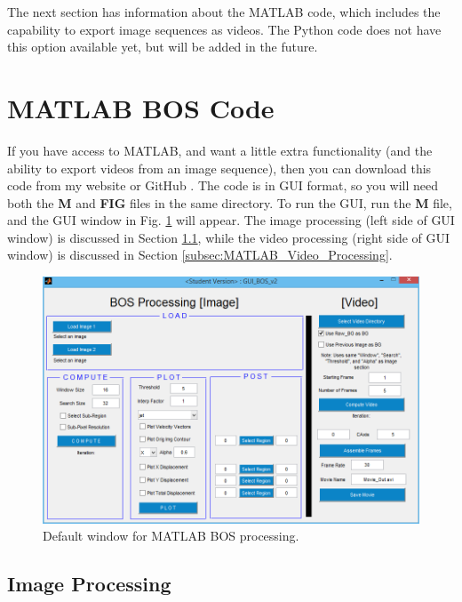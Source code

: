 \documentclass[letterpaper,12pt]{article}
\begin{document}
The next section has information about the MATLAB code, which includes the capability to export image sequences as videos.  The Python code does not have this option available yet, but will be added in the future.

\section{MATLAB BOS Code}
\label{sec:MATLAB_BOS_Code}

If you have access to MATLAB, and want a little extra functionality (and the ability to export videos from an image sequence), then you can download this code from my website \cite{JTE_Website} or GitHub \cite{JTE_GitHub}.  The code is in GUI format, so you will need both the \textbf{M} and \textbf{FIG} files in the same directory.  To run the GUI, run the \textbf{M} file, and the GUI window in Fig. \ref{fig:MATLAB_GUI_BOS} will appear.  The image processing (left side of GUI window) is discussed in Section \ref{subsec:MATLAB_Image_Processing}, while the video processing (right side of GUI window) is discussed in Section \ref{subsec:MATLAB_Video_Processing}.

\begin{figure}[h]
    \centering
    \includegraphics[width=0.8\linewidth]{MATLAB_GUI_BOS.PNG}
    \caption{Default window for MATLAB BOS processing.}
    \label{fig:MATLAB_GUI_BOS}
\end{figure}

\subsection{Image Processing}
\label{subsec:MATLAB_Image_Processing}
\end{document}
